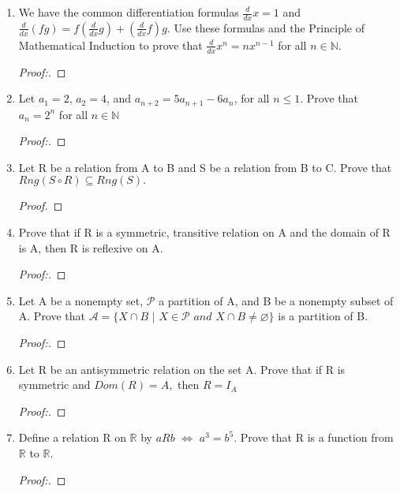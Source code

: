 \documentclass[11pt]{article}
\begin{document}
\begin{enumerate}
    \item We have the common differentiation formulas $\frac{d}{dx} x=1$ and $\frac{d}{dx}(fg)=f(\frac{d}{dx}g) + (\frac{d}{dx}f)g$. 
    \newline Use these formulas and the Principle of Mathematical Induction to prove that $\frac{d}{dx}x^n = nx^{n-1}$ for all $n \in \mathbb{N}$.
        \begin{proof}[Proof:\nopunct]
        \end{proof}
        
    \item Let $a_1=2$, $a_2=4$, and $a_{n+2} = 5a_{n+1} - 6a_n$, for all $n \leq 1.$ Prove that $a_n = 2^n$ for all $n \in \mathbb{N}$
        \begin{proof}[Proof:\nopunct]
        \end{proof}
        
    \item Let R be a relation from A to B and S be a relation from B to C. \newline
    Prove that $Rng(S\circ R) \subseteq Rng(S).$
        \begin{proof}
        \end{proof}
        
    \item Prove that if R is a symmetric, transitive relation on A and the domain of R is A, then R is reflexive on A. 
     \begin{proof}[Proof:\nopunct]
        \end{proof}
        
    \item Let A be a nonempty set, $\mathscr{P}$ a partition of A, and B be a nonempty subset of A. \newline Prove that $\mathscr{A}=\{X \cap B$ $|$ $X \in \mathscr{P}$ $and$ $X \cap B \neq \varnothing \}$ is a partition of B.
        \begin{proof}[Proof:\nopunct]
        \end{proof}
        
    \item Let R be an antisymmetric relation on the set A. 
    \newnline Prove that if R is symmetric and $Dom(R) = A,$ then $R=I_A$
       \begin{proof}[Proof:\nopunct]
        \end{proof}
        
    \item Define a relation R on $\mathbb{R}$ by $aRb$ $\iff$ $a^3=b^5$. Prove that R is a function from $\mathbb{R}$ to $\mathbb{R}.$
       \begin{proof}[Proof:\nopunct]
        \end{proof}
        

\end{enumerate}
\end{document}
